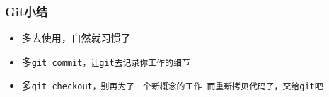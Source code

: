 \begin{frame}
    \frametitle{Git小结}
        \begin{itemize}
            \item 多去使用，自然就习惯了
            \item 多\tt{git commit}，让git去记录你工作的细节
            \item 多\tt{git checkout}，别再为了一个新概念的工作
                  而重新拷贝代码了，交给git吧
        \end{itemize}
\end{frame}
